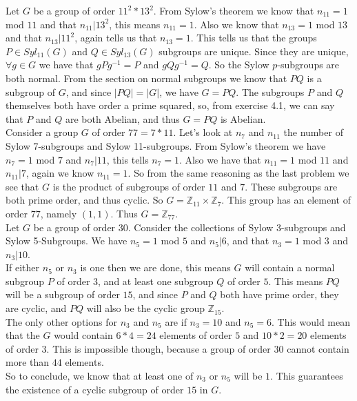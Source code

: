 \documentclass[12pt]{report}
\begin{document}
 Let $G$ be a group of order $11^2 * 13^2$. From
Sylow's theorem we know that $n_{11} = 1$ mod $11$ and that $n_{11} | 13^2$,
this means $n_{11} = 1$. Also we know that $n_{13} = 1$ mod $13$ and that
$n_{13} | 11^2$, again tells us that $n_{13} = 1$. This tells us that the groups
$P \in Syl_{11}(G)$ and $Q \in Syl_{13}(G)$ subgroups are unique. Since they are
unique, $\forall g \in G$ we have that $gPg^{-1} = P$ and $gQg^{-1} = Q$. So the
Sylow $p$-subgroups are both normal. From the section on normal subgroups we
know that $PQ$ is a subgroup of $G$, and since $|PQ| = |G|$, we have $G = PQ$.
The subgroups $P$ and $Q$ themselves both have order a prime squared, so, from
exercise 4.1, we can say that $P$ and $Q$ are both Abelian, and thus $G = PQ$ is
Abelian.\\

 Consider a group $G$ of order $77 = 7*11$. Let's look
at $n_7$ and $n_11$ the number of Sylow 7-subgroups and Sylow 11-subgroups. From
Sylow's theorem we have $n_7 = 1$ mod $7$ and $n_7 | 11$, this tells $n_7 = 1$.
Also we have that $n_{11} = 1$ mod $11$ and $n_{11} | 7$, again we know $n_{11}
= 1$. So from the same reasoning as the last problem we see that $G$ is the
product of subgroups of order $11$ and $7$. These subgroups are both prime
order, and thus cyclic. So $G = \mathbb{Z}_{11} \times \mathbb{Z}_7$. This group
has an element of order $77$, namely $(1,1)$. Thus $G = \mathbb{Z}_{77}$.\\

 Let $G$ be a group of order $30$. Consider the
collections of Sylow 3-subgroups and Sylow 5-Subgroups. We have $n_5=1$ mod $5$
and $n_5|6$, and that $n_3 = 1$ mod $3$ and $n_3|10$.\\

If either $n_5$ or $n_3$ is one then we are done, this means $G$ will contain a
normal subgroup $P$ of order $3$, and at least one subgroup $Q$ of order $5$.
This means $PQ$ will be a subgroup of order $15$, and since $P$ and $Q$ both
have prime order, they are cyclic, and $PQ$ will also be the cyclic group
$\mathbb{Z}_{15}$.\\

The only other options for $n_3$ and $n_5$ are if $n_3 = 10$ and $n_5 = 6$.
This would mean that the $G$ would contain $6*4=24$ elements of order $5$ and
$10*2=20$ elements of order $3$. This is impossible though, because a group of
order $30$ cannot contain more than $44$ elements.\\

So to conclude, we know that at least one of $n_3$ or $n_5$ will be $1$. This
guarantees the existence of a cyclic subgroup of order $15$ in $G$.\\
\end{document}

